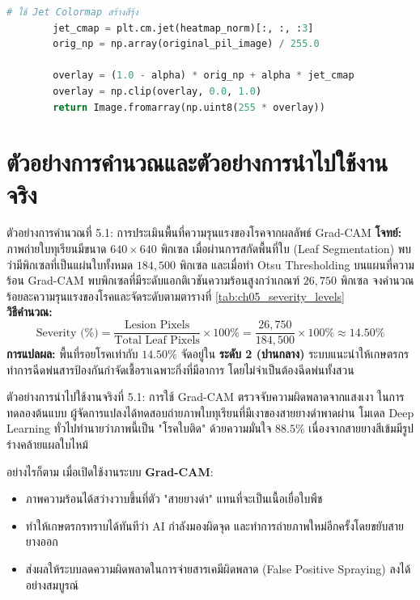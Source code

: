 \begin{lstlisting}[language=Python, caption=คลาส GradCAM และฟังก์ชันประมวลผลแผนที่ความร้อนซ้อนทับภาพจริงด้วย PyTorch และ PIL]
        # ใช้ Jet Colormap สร้างสีรุ้ง
        jet_cmap = plt.cm.jet(heatmap_norm)[:, :, :3]
        orig_np = np.array(original_pil_image) / 255.0

        overlay = (1.0 - alpha) * orig_np + alpha * jet_cmap
        overlay = np.clip(overlay, 0.0, 1.0)
        return Image.fromarray(np.uint8(255 * overlay))
\end{lstlisting}

\section{ตัวอย่างการคำนวณและตัวอย่างการนำไปใช้งานจริง}

\begin{examplebox}{ตัวอย่างการคำนวณที่ 5.1: การประเมินพื้นที่ความรุนแรงของโรคจากผลลัพธ์ Grad-CAM}
\textbf{โจทย์:} ภาพถ่ายใบทุเรียนมีขนาด $640 \times 640$ พิกเซล เมื่อผ่านการสกัดพื้นที่ใบ (Leaf Segmentation) พบว่ามีพิกเซลที่เป็นแผ่นใบทั้งหมด $184,500$ พิกเซล และเมื่อทำ Otsu Thresholding บนแผนที่ความร้อน Grad-CAM พบพิกเซลที่มีระดับแอกติเวชันความร้อนสูงกว่าเกณฑ์ $26,750$ พิกเซล จงคำนวณร้อยละความรุนแรงของโรคและจัดระดับตามตารางที่ \ref{tab:ch05_severity_levels}\\[4pt]
\textbf{วิธีคำนวณ:}
\[
\text{Severity (\%)} = \frac{\text{Lesion Pixels}}{\text{Total Leaf Pixels}} \times 100\% = \frac{26,750}{184,500} \times 100\% \approx 14.50\%
\]
\textbf{การแปลผล:} พื้นที่รอยโรคเท่ากับ $14.50\%$ จัดอยู่ใน \textbf{ระดับ 2 (ปานกลาง)} ระบบแนะนำให้เกษตรกรทำการฉีดพ่นสารป้องกันกำจัดเชื้อราเฉพาะกิ่งที่มีอาการ โดยไม่จำเป็นต้องฉีดพ่นทั้งสวน
\end{examplebox}

\begin{casestudybox}{ตัวอย่างการนำไปใช้งานจริงที่ 5.1: การใช้ Grad-CAM ตรวจจับความผิดพลาดจากแสงเงา}
ในการทดลองต้นแบบ ผู้จัดการแปลงได้ทดสอบถ่ายภาพใบทุเรียนที่มีเงาของสายยางดำพาดผ่าน โมเดล Deep Learning ทั่วไปทำนายว่าภาพนี้เป็น "โรคใบติด" ด้วยความมั่นใจ $88.5\%$ เนื่องจากสายยางสีเข้มมีรูปร่างคล้ายแผลใบไหม้

อย่างไรก็ตาม เมื่อเปิดใช้งานระบบ \textbf{Grad-CAM}:
\begin{itemize}[leftmargin=1.4em, itemsep=2pt]
    \item ภาพความร้อนได้สว่างวาบขึ้นที่ตัว "สายยางดำ" แทนที่จะเป็นเนื้อเยื่อใบพืช
    \item ทำให้เกษตรกรทราบได้ทันทีว่า AI กำลังมองผิดจุด และทำการถ่ายภาพใหม่อีกครั้งโดยขยับสายยางออก
    \item ส่งผลให้ระบบลดความผิดพลาดในการจ่ายสารเคมีผิดพลาด (False Positive Spraying) ลงได้อย่างสมบูรณ์
\end{itemize}
\end{casestudybox}

